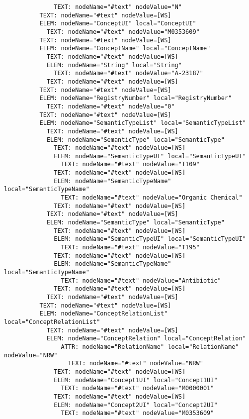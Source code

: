 \documentclass[11pt,english]{article}
\begin{document}
\begin{enumerate}
\begin{lstlisting}
              TEXT: nodeName="#text" nodeValue="N"
          TEXT: nodeName="#text" nodeValue=[WS]
          ELEM: nodeName="ConceptUI" local="ConceptUI"
            TEXT: nodeName="#text" nodeValue="M0353609"
          TEXT: nodeName="#text" nodeValue=[WS]
          ELEM: nodeName="ConceptName" local="ConceptName"
            TEXT: nodeName="#text" nodeValue=[WS]
            ELEM: nodeName="String" local="String"
              TEXT: nodeName="#text" nodeValue="A-23187"
            TEXT: nodeName="#text" nodeValue=[WS]
          TEXT: nodeName="#text" nodeValue=[WS]
          ELEM: nodeName="RegistryNumber" local="RegistryNumber"
            TEXT: nodeName="#text" nodeValue="0"
          TEXT: nodeName="#text" nodeValue=[WS]
          ELEM: nodeName="SemanticTypeList" local="SemanticTypeList"
            TEXT: nodeName="#text" nodeValue=[WS]
            ELEM: nodeName="SemanticType" local="SemanticType"
              TEXT: nodeName="#text" nodeValue=[WS]
              ELEM: nodeName="SemanticTypeUI" local="SemanticTypeUI"
                TEXT: nodeName="#text" nodeValue="T109"
              TEXT: nodeName="#text" nodeValue=[WS]
              ELEM: nodeName="SemanticTypeName" local="SemanticTypeName"
                TEXT: nodeName="#text" nodeValue="Organic Chemical"
              TEXT: nodeName="#text" nodeValue=[WS]
            TEXT: nodeName="#text" nodeValue=[WS]
            ELEM: nodeName="SemanticType" local="SemanticType"
              TEXT: nodeName="#text" nodeValue=[WS]
              ELEM: nodeName="SemanticTypeUI" local="SemanticTypeUI"
                TEXT: nodeName="#text" nodeValue="T195"
              TEXT: nodeName="#text" nodeValue=[WS]
              ELEM: nodeName="SemanticTypeName" local="SemanticTypeName"
                TEXT: nodeName="#text" nodeValue="Antibiotic"
              TEXT: nodeName="#text" nodeValue=[WS]
            TEXT: nodeName="#text" nodeValue=[WS]
          TEXT: nodeName="#text" nodeValue=[WS]
          ELEM: nodeName="ConceptRelationList" local="ConceptRelationList"
            TEXT: nodeName="#text" nodeValue=[WS]
            ELEM: nodeName="ConceptRelation" local="ConceptRelation"
                ATTR: nodeName="RelationName" local="RelationName" nodeValue="NRW"
                  TEXT: nodeName="#text" nodeValue="NRW"
              TEXT: nodeName="#text" nodeValue=[WS]
              ELEM: nodeName="Concept1UI" local="Concept1UI"
                TEXT: nodeName="#text" nodeValue="M0000001"
              TEXT: nodeName="#text" nodeValue=[WS]
              ELEM: nodeName="Concept2UI" local="Concept2UI"
                TEXT: nodeName="#text" nodeValue="M0353609"

\end{lstlisting}
\end{enumerate}
\end{document}
